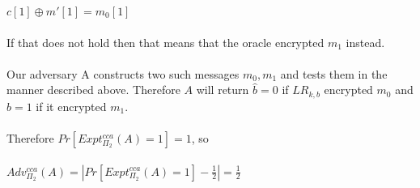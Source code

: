 \documentclass[]{article}
\begin{document}
\begin{enumerate}[label=(\alph*)]
	$c[1] \oplus m'[1] = m_0[1]$
	\\\\
	If that does not hold then that means that the oracle encrypted $m_1$ instead.
	\\\\
	Our adversary A constructs two such messages $m_0, m_1$ and tests them in the manner described above. Therefore $A$ will return $\hat{b} = 0$ if $LR_{k,b}$ encrypted $m_0$ and $\hat{b} = 1$ if it encrypted $m_1$.
	\\\\
	Therefore $Pr[Expt^{cca}_{\Pi_2}(A) = 1] = 1$, so
	\\\\
	$Adv_{\Pi_2}^{cca}(A) = | Pr[Expt^{cca}_{\Pi_2}(A) = 1] - \frac{1}{2} | = \frac{1}{2}$
\end{enumerate}
\subsection{}
\end{document}
